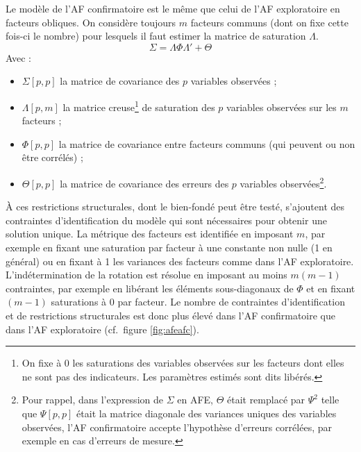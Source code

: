 \documentclass[12pt,a4paper]{reedthesis}
\providecommand{\tightlist}{%
  \setlength{\itemsep}{0pt}\setlength{\parskip}{0pt}}
\begin{document}
Le modèle de l'AF confirmatoire est le même que celui de l'AF exploratoire en facteurs obliques. On considère toujours \(m\) facteurs communs (dont on fixe cette fois-ci le nombre) pour lesquels il faut estimer la matrice de saturation \(\Lambda\).
\begin{equation} 
\Sigma = \Lambda \Phi \Lambda' + \Theta 
\label{eq:eq6}
\end{equation}
Avec :
\begin{itemize}
\tightlist
\item
  \(\Sigma [p, p]\) la matrice de covariance des \(p\) variables observées ;
\item
  \(\Lambda [p, m]\) la matrice creuse\footnote{On fixe à 0 les saturations des variables observées sur les facteurs dont elles ne sont pas des indicateurs. Les paramètres estimés sont dits libérés.} de saturation des \(p\) variables observées sur les \(m\) facteurs ;
\item
  \(\Phi[p, p]\) la matrice de covariance entre facteurs communs (qui peuvent ou non être corrélés) ;
\item
  \(\Theta [p, p]\) la matrice de covariance des erreurs des \(p\) variables observées\footnote{Pour rappel, dans l'expression de \(\Sigma\) en AFE, \(\Theta\) était remplacé par \(\Psi^2\) telle que \(\Psi [p, p]\) était la matrice diagonale des variances uniques des variables observées, l'AF confirmatoire accepte l'hypothèse d'erreurs corrélées, par exemple en cas d'erreurs de mesure.}.
\end{itemize}
À ces restrictions structurales, dont le bien-fondé peut être testé, s'ajoutent des contraintes d'identification du modèle qui sont nécessaires pour obtenir une solution unique. La métrique des facteurs est identifiée en imposant \(m\), par exemple en fixant une saturation par facteur à une constante non nulle (1 en général) ou en fixant à 1 les variances des facteurs comme dans l'AF exploratoire. L'indétermination de la rotation est résolue en imposant au moins \(m(m-1)\) contraintes, par exemple en libérant les éléments sous-diagonaux de \(\Phi\) et en fixant \((m-1)\) saturations à 0 par facteur. Le nombre de contraintes d'identification et de restrictions structurales est donc plus élevé dans l'AF confirmatoire que dans l'AF exploratoire (cf.~figure \ref{fig:afeafc}).
\end{document}
